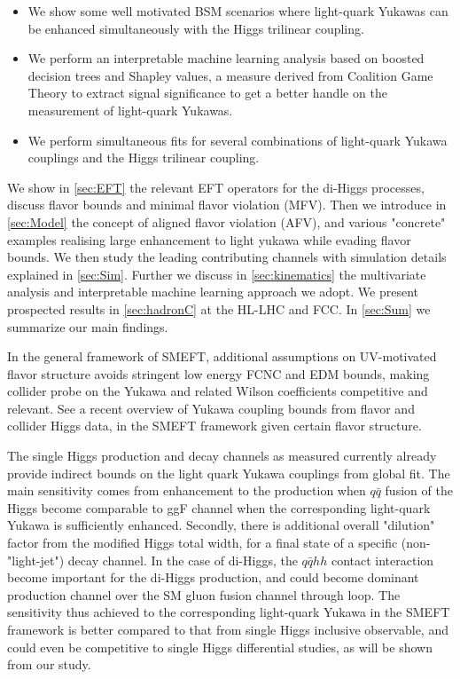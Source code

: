 \begin{itemize}
	\item We show some well motivated BSM scenarios where light-quark Yukawas can be enhanced simultaneously with the Higgs trilinear coupling.
	\item We perform an interpretable machine learning analysis based on boosted decision trees and Shapley values, a measure derived from Coalition Game Theory to extract signal significance to get a better handle on the measurement of light-quark Yukawas.
	\item We perform simultaneous fits for several combinations of light-quark Yukawa couplings and the Higgs trilinear coupling.
\end{itemize}

We show in \autoref{sec:EFT} the relevant EFT operators for the di-Higgs processes, discuss flavor bounds and minimal flavor violation (MFV). Then we introduce in \autoref{sec:Model} the concept of aligned flavor violation (AFV), and various "concrete" examples realising large enhancement to light yukawa while evading flavor bounds. We then study the leading contributing channels with simulation details explained in \autoref{sec:Sim}. Further we discuss in \autoref{sec:kinematics} the multivariate analysis and interpretable machine learning approach we adopt. We present prospected results in \autoref{sec:hadronC} at the HL-LHC and FCC. In \autoref{sec:Sum} we summarize our main findings.



In the general framework of SMEFT, additional assumptions on UV-motivated flavor structure avoids stringent low energy FCNC and EDM bounds, making collider probe on the Yukawa and related Wilson coefficients competitive and relevant. See a recent overview of Yukawa coupling bounds from flavor and collider Higgs data, in the SMEFT framework given certain flavor structure. \cite{Alonso-Gonzalez:2021tpo}

The single Higgs production and decay channels as measured currently already provide indirect bounds on the light quark Yukawa couplings from global fit. The main sensitivity comes from enhancement to the production when $q\bar q$ fusion of the Higgs become comparable to ggF channel when the corresponding light-quark Yukawa is sufficiently enhanced. Secondly, there is additional overall "dilution" factor from the modified Higgs total width, for a final state of a specific (non-"light-jet") decay channel.
In the case of di-Higgs, the $q\bar q hh$ contact interaction become important for the di-Higgs production, and could become dominant production channel over the SM gluon fusion channel through loop. The sensitivity thus achieved to the corresponding light-quark Yukawa in the SMEFT framework is better compared to that from single Higgs inclusive observable, and could even be competitive to single Higgs differential studies, as will be shown from our study.

